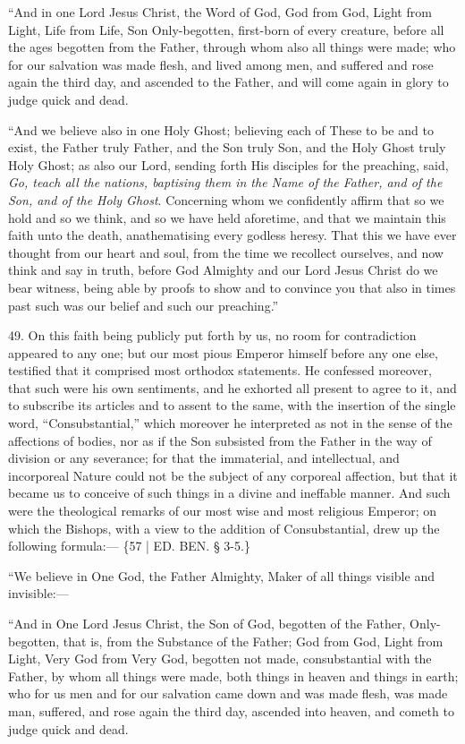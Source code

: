 ``And in one Lord Jesus Christ,
the Word of God, God from God, Light from Light, Life from Life, Son
Only-begotten, first-born of every creature, before all the ages
begotten from the Father, through whom also all things were made; who
for our salvation was made flesh, and lived among men, and suffered
and rose again the third day, and ascended to the Father, and will
come again in glory to judge quick and dead.

``And we believe also in one
Holy Ghost; believing each of These to be and to exist, the Father
truly Father, and the Son truly Son, and the Holy Ghost truly Holy
Ghost; as also our Lord, sending forth His disciples for the
preaching, said, \emph{Go, teach all the nations, baptising them in the
Name of the Father, and of the Son, and of the Holy Ghost}.
Concerning whom we confidently affirm that so we hold and so we think,
and so we have held aforetime, and that we maintain this faith unto
the death, anathematising every godless heresy. That this we have ever
thought from our heart and soul, from the time we recollect ourselves,
and now think and say in truth, before God Almighty and our Lord Jesus
Christ do we bear witness, being able by proofs to show and to
convince you that also in times past such was our belief and such our
preaching.''

49. On this faith being
publicly put forth by us, no room for contradiction appeared to any
one; but our most pious Emperor himself before any one else, testified
that it comprised most orthodox statements. He confessed moreover,
that such were his own sentiments, and he exhorted all present to
agree to it, and to subscribe its articles and to assent to the same,
with the insertion of the single word, ``Consubstantial,'' which
moreover he interpreted as not in the sense of the affections of
bodies, nor as if the Son subsisted from the Father in the way of
division or any severance; for that the immaterial, and intellectual,
and incorporeal Nature could not be the subject of any corporeal
affection, but that it became us to conceive of such things in a
divine and ineffable manner. And such were the theological remarks of
our most wise and most religious Emperor; on which the Bishops, with a
view to the addition of Consubstantial, drew up the following
formula:— \{57 | ED. BEN. § 3-5.\}


``We believe in One God, the
Father Almighty, Maker of all things visible and invisible:—

``And in One Lord Jesus Christ,
the Son of God, begotten of the Father, Only-begotten, that is, from
the Substance of the Father; God from God, Light from Light, Very God
from Very God, begotten not made, consubstantial with the Father, by
whom all things were made, both things in heaven and things in earth;
who for us men and for our salvation came down and was made flesh, was
made man, suffered, and rose again the third day, ascended into
heaven, and cometh to judge quick and dead.

